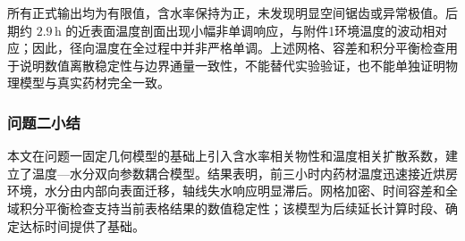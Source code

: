 所有正式输出均为有限值，含水率保持为正，未发现明显空间锯齿或异常极值。后期约 $2.9\,\mathrm{h}$ 的近表面温度剖面出现小幅非单调响应，与附件1环境温度的波动相对应；因此，径向温度在全过程中并非严格单调。上述网格、容差和积分平衡检查用于说明数值离散稳定性与边界通量一致性，不能替代实验验证，也不能单独证明物理模型与真实药材完全一致。

\subsubsection{问题二小结}

本文在问题一固定几何模型的基础上引入含水率相关物性和温度相关扩散系数，建立了温度—水分双向参数耦合模型。结果表明，前三小时内药材温度迅速接近烘房环境，水分由内部向表面迁移，轴线失水响应明显滞后。网格加密、时间容差和全域积分平衡检查支持当前表格结果的数值稳定性；该模型为后续延长计算时段、确定达标时间提供了基础。
